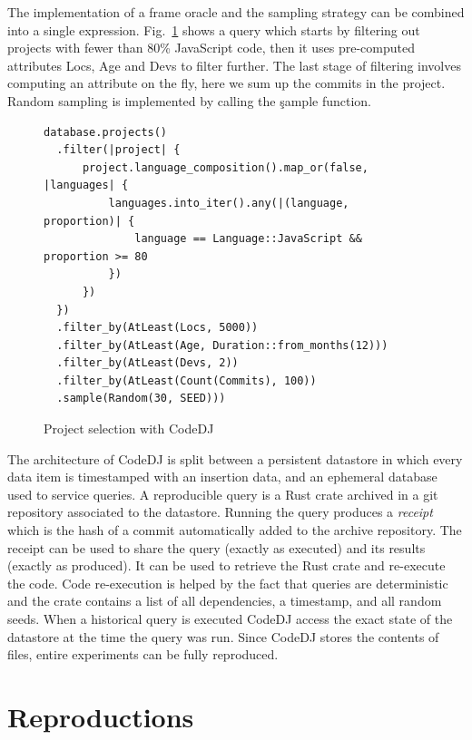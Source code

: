 \documentclass[sigconf,review,anonymous]{acmart}
\renewcommand{\dj}{{\textsf{Code{\small{DJ}}}}\xspace}
\begin{document}
The implementation of a frame oracle and the sampling strategy can be combined
into a single expression. Fig.~\ref{fig:style-analyzer-query} shows a query
which starts by filtering out projects with fewer than 80\% JavaScript code,
then it uses pre-computed attributes Locs, Age and Devs to filter further. The
last stage of filtering involves computing an attribute on the fly, here we sum
up the commits in the project. Random sampling is implemented by calling the
\c{sample} function.

\begin{figure}[!h]
  {\footnotesize\begin{verbatim}
database.projects()
  .filter(|project| {
      project.language_composition().map_or(false, |languages| {
          languages.into_iter().any(|(language, proportion)| {
              language == Language::JavaScript && proportion >= 80
          })
      })
  })
  .filter_by(AtLeast(Locs, 5000))
  .filter_by(AtLeast(Age, Duration::from_months(12)))
  .filter_by(AtLeast(Devs, 2))
  .filter_by(AtLeast(Count(Commits), 100))
  .sample(Random(30, SEED)))
\end{verbatim}}
\vspace{-4mm} \caption{Project selection with \dj}\label{fig:style-analyzer-query}
\end{figure}

The architecture of \dj is split between a persistent datastore in which every
data item is timestamped with an insertion data, and an ephemeral database used
to service queries. A reproducible query is a Rust crate archived in a git
repository associated to the datastore. Running the query produces a
\emph{receipt} which is the hash of a commit automatically added to the archive
repository. The receipt can be used to share the query (exactly as executed) and
its results (exactly as produced). It can be used to retrieve the Rust crate and
re-execute the code. Code re-execution is helped by the fact that queries are
deterministic and the crate contains a list of all dependencies, a timestamp,
and all random seeds. When a historical query is executed \dj access the exact
state of the datastore at the time the query was run. Since \dj stores the
contents of files, entire experiments can be fully reproduced.

\newpage

\section{Reproductions}
\end{document}
